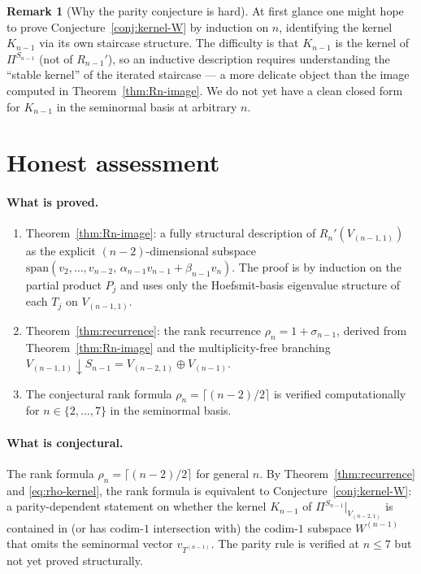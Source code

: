 \documentclass[11pt]{article}
\theoremstyle{definition}
\newtheorem{remark}[theorem]{Remark}
\begin{document}
\begin{remark}[Why the parity conjecture is hard]
At first glance one might hope to prove
Conjecture~\ref{conj:kernel-W} by induction on $n$, identifying
the kernel $K_{n-1}$ via its own staircase structure. The
difficulty is that $K_{n-1}$ is the kernel of $\Pi^{S_{n-1}}$ (not of
$R_{n-1}'$), so an inductive description requires understanding the
``stable kernel'' of the iterated staircase --- a more delicate object
than the image computed in Theorem~\ref{thm:Rn-image}. We do not yet
have a clean closed form for $K_{n-1}$ in the seminormal basis at
arbitrary $n$.
\end{remark}

\section{Honest assessment}\label{sec:honest}

\paragraph{What is proved.}
\begin{enumerate}[leftmargin=2em,topsep=0.3em,itemsep=0.2em]
\item Theorem~\ref{thm:Rn-image}: a fully structural description of
$R_n'(V_{(n-1,1)})$ as the explicit $(n-2)$-dimensional subspace
$\mathrm{span}(v_2, \ldots, v_{n-2},\,
\alpha_{n-1} v_{n-1} + \beta_{n-1} v_n)$. The proof is by induction on
the partial product $P_j$ and uses only the Hoefsmit-basis
eigenvalue structure of each $T_j$ on $V_{(n-1,1)}$.
\item Theorem~\ref{thm:recurrence}: the rank recurrence
$\rho_n = 1 + \sigma_{n-1}$, derived from
Theorem~\ref{thm:Rn-image} and the multiplicity-free branching
$V_{(n-1,1)}\downarrow S_{n-1} = V_{(n-2,1)} \oplus V_{(n-1)}$.
\item The conjectural rank formula
$\rho_n = \lceil(n-2)/2\rceil$ is verified computationally for
$n \in \{2, \ldots, 7\}$ in the seminormal basis.
\end{enumerate}

\paragraph{What is conjectural.}
The rank formula $\rho_n = \lceil(n-2)/2\rceil$ for general $n$.
By Theorem~\ref{thm:recurrence} and \eqref{eq:rho-kernel}, the rank
formula is equivalent to Conjecture~\ref{conj:kernel-W}: a parity-dependent
statement on whether the kernel $K_{n-1}$ of $\Pi^{S_{n-1}}|_{V_{(n-2,1)}}$
is contained in (or has codim-$1$ intersection with) the codim-$1$ subspace
$W^{(n-1)}$ that omits the seminormal vector $v_{T^{(n-1)}}$. The
parity rule is verified at $n \le 7$ but not yet proved structurally.
\end{document}
